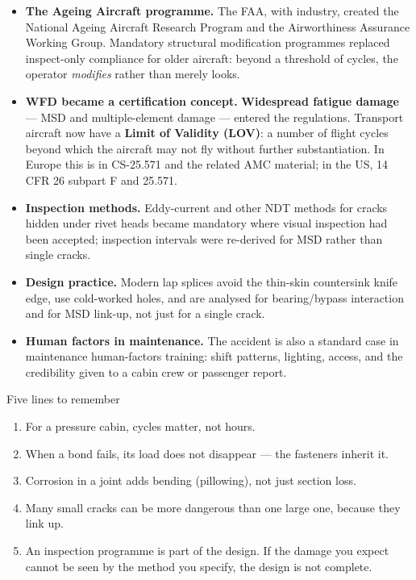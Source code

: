 \documentclass[11pt,a4paper]{article}
\begin{document}
\begin{itemize}[nosep]
  \item \textbf{The Ageing Aircraft programme.} The FAA, with industry, created the National Ageing Aircraft Research Program and the Airworthiness Assurance Working Group. Mandatory structural modification programmes replaced inspect-only compliance for older aircraft: beyond a threshold of cycles, the operator \emph{modifies} rather than merely looks.
  \item \textbf{WFD became a certification concept.} \textbf{Widespread fatigue damage} --- MSD and multiple-element damage --- entered the regulations. Transport aircraft now have a \textbf{Limit of Validity (LOV)}: a number of flight cycles beyond which the aircraft may not fly without further substantiation. In Europe this is in CS-25.571 and the related AMC material; in the US, 14 CFR 26 subpart F and 25.571.
  \item \textbf{Inspection methods.} Eddy-current and other NDT methods for cracks hidden under rivet heads became mandatory where visual inspection had been accepted; inspection intervals were re-derived for MSD rather than single cracks.
  \item \textbf{Design practice.} Modern lap splices avoid the thin-skin countersink knife edge, use cold-worked holes, and are analysed for bearing/bypass interaction and for MSD link-up, not just for a single crack.
  \item \textbf{Human factors in maintenance.} The accident is also a standard case in maintenance human-factors training: shift patterns, lighting, access, and the credibility given to a cabin crew or passenger report.
\end{itemize}

\begin{sumbox}{Five lines to remember}
\begin{enumerate}[nosep]
  \item For a pressure cabin, cycles matter, not hours.
  \item When a bond fails, its load does not disappear --- the fasteners inherit it.
  \item Corrosion in a joint adds bending (pillowing), not just section loss.
  \item Many small cracks can be more dangerous than one large one, because they link up.
  \item An inspection programme is part of the design. If the damage you expect cannot be seen by the method you specify, the design is not complete.
\end{enumerate}
\end{sumbox}
\end{document}

